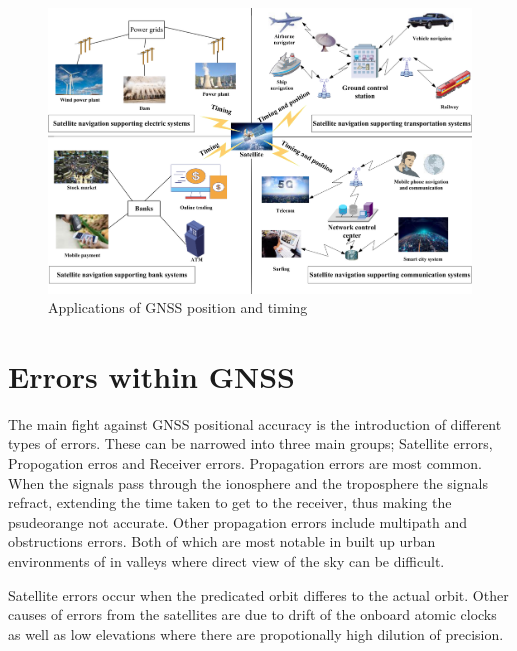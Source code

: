 \begin{figure}[h]
    \begin{centering}
        \includegraphics[width=14cm,keepaspectratio]{Figures/GNSS applications.png}
        \caption{Applications of GNSS position and timing \cite{RN33}}
        \label{fig:GNSS Applications}
    \end{centering}
\end{figure}


\section{Errors within GNSS}
The main fight against GNSS positional accuracy is the introduction of different types of errors. These can be narrowed into three main groups; Satellite errors,
Propogation erros and Receiver errors. Propagation errors are most common. When the signals pass through the ionosphere and the troposphere the signals refract, extending
the time taken to get to the receiver, thus making the psudeorange not accurate. Other propagation errors include multipath and obstructions errors. Both of which are
most notable in built up urban environments of in valleys where direct view of the sky can be difficult.

Satellite errors occur when the predicated orbit differes to the actual orbit. Other causes of errors from the satellites are due to drift of the onboard atomic clocks as
well as low elevations where there are propotionally high dilution of precision.

